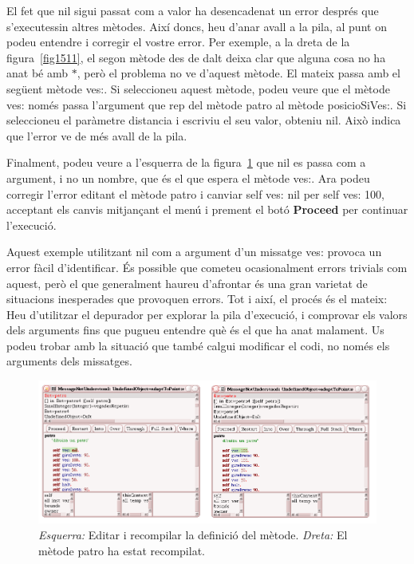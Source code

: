El fet que \textsf{nil} sigui passat com a valor ha desencadenat un error després que s'executessin altres mètodes. Així doncs, heu d'anar avall a la pila, al punt on podeu entendre i corregir el vostre error. Per exemple, a la dreta de la figura~\ref{fig1511}, el segon mètode des de dalt deixa clar que alguna cosa no ha anat bé amb $*$, però el problema no ve d'aquest mètode. El mateix passa amb el següent mètode \textsf{ves:}. Si seleccioneu aquest mètode, podeu veure que el mètode \textsf{ves:} només passa l'argument que rep del mètode \textsf{patro} al mètode \textsf{posicioSiVes:}. Si seleccioneu el paràmetre \textsf{distancia} i escriviu el seu valor, obteniu \textsf{nil}. Això indica que l'error ve de més avall de la pila.

Finalment, podeu veure a l'esquerra de la figura~\ref{fig1512} que \textsf{nil} es passa com a argument, i no un nombre, que és el que espera el mètode \textsf{ves:}. Ara podeu corregir l'error editant el mètode \textsf{patro} i canviar \textsf{self ves: nil} per \textsf{self ves: 100}, acceptant els canvis mitjançant el menú i prement el botó \textbf{Proceed} per continuar l'execució.

Aquest exemple utilitzant \textsf{nil} com a argument d'un missatge \textsf{ves:} provoca un error fàcil d'identificar. És possible que cometeu ocasionalment errors trivials com aquest, però el que generalment haureu d'afrontar és una gran varietat de situacions inesperades que provoquen errors. Tot i així, el procés és el mateix: Heu d'utilitzar el depurador per explorar la pila d'execució, i comprovar els valors dels arguments fins que pugueu entendre què és el que ha anat malament. Us podeu trobar amb la situació que també calgui modificar el codi, no només els arguments dels missatges.   
\begin{figure}[hb]
\begin{center}
\includegraphics[scale=0.4]{Imatges/figura15-12.png}
\end{center}
\caption{\emph{Esquerra:} Editar i recompilar la definició del mètode. 
\emph{Dreta:} El mètode \textsf{\upshape patro} ha estat recompilat.}
\label{fig1512}
\end{figure}

